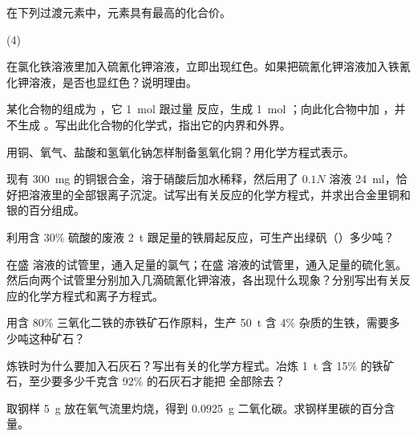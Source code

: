 \begin{Review}
\begin{question}
  \item 在下列过渡元素中，元素具有最高的化合价。
  \begin{tasks}[label=\Alph*.](4)
    \task {}
    \task {}
    \task {}
    \task {}
    \task {}
    \task {}
    \task {}
    \task {}
  \end{tasks}
  \item 在氯化铁溶液里加入硫氰化钾溶液，立即出现红色。如果把硫氰化钾溶液加入铁氰化钾溶液，是否也显红色？说明理由。
  \item 某化合物的组成为 ，它 \qty{1}{mol} 跟过量  反应，生成 \qty{1}{mol} ；向此化合物中加 ，并不生成 。写出此化合物的化学式，指出它的内界和外界。
  \item 用铜、氧气、盐酸和氢氧化钠怎样制备氢氧化铜？用化学方程式表示。
  \item 现有 \qty{300}{mg} 的铜银合金，溶于硝酸后加水稀释，然后用了 $0.1N$  溶液 \qty{24}{ml}，恰好把溶液里的全部银离子沉淀。试写出有关反应的化学方程式，并求出合金里铜和银的百分组成。
  \item 利用含 30\% 硫酸的废液 \qty{2}{t} 跟足量的铁屑起反应，可生产出绿矾（）多少吨？
  \item 在盛  溶液的试管里，通入足量的氯气；在盛  溶液的试管里，通入足量的硫化氢。然后向两个试管里分别加入几滴硫氰化钾溶液，各出现什么现象？分别写出有关反应的化学方程式和离子方程式。
  \item 用含 80\% 三氧化二铁的赤铁矿石作原料，生产 \qty{50}{t} 含 4\% 杂质的生铁，需要多少吨这种矿石？
  \item 炼铁时为什么要加入石灰石？写出有关的化学方程式。冶炼 \qty{1}{t} 含 15\%  的铁矿石，至少要多少千克含 92\%  的石灰石才能把  全部除去？
  \item 取钢样 \qty{5}{g} 放在氧气流里灼烧，得到 \qty{0.0925}{g} 二氧化碳。求钢样里碳的百分含量。
\end{question}
\end{Review}